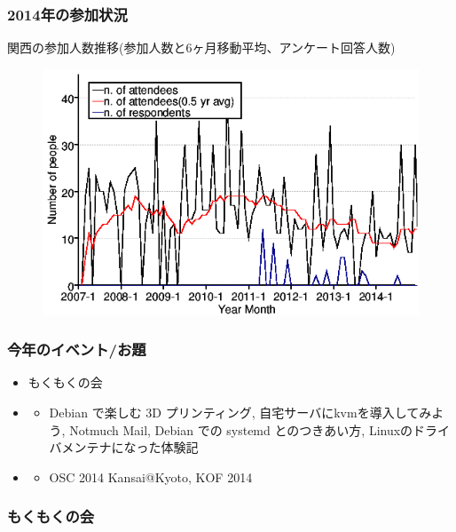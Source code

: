 \documentclass[cjk,dvipdfmx,10pt,compress,%
hyperref={bookmarks=true,bookmarksnumbered=true,bookmarksopen=false,%
colorlinks=false,%
pdftitle={第 92 回 関西 Debian 勉強会},%
pdfauthor={倉敷・のがた・佐々木・かわだ},%
pdfsubject={資料},%
}]{beamer}
\begin{document}
\begin{frame}
  \frametitle{2014年の参加状況}
  \centering
  関西の参加人数推移(参加人数と6ヶ月移動平均、アンケート回答人数)
  \begin{figure}[h]
    \begin{center}
      \includegraphics[width=.6\hsize]{image201412/memberanalysis/kansai.png}
    \end{center}
  \end{figure}
\end{frame}

\begin{frame}
  \frametitle{今年のイベント/お題}
  \begin{itemize}
  \item もくもくの会
  \item \color[rgb]{1,0,0}{セッション}
    \begin{itemize}
    \item Debian で楽しむ 3D プリンティング, 自宅サーバにkvmを導入してみよう,
      Notmuch Mail, Debian での systemd とのつきあい方, Linuxのドライバメンテナになった体験記
    \end{itemize}
  \item \color[rgb]{0,0,1}{イベント}
    \begin{itemize}
    \item OSC 2014 Kansai@Kyoto, KOF 2014
    \end{itemize}
  \end{itemize}
\end{frame}

\begin{frame}
  \frametitle{もくもくの会}
\end{frame}
\end{document}
